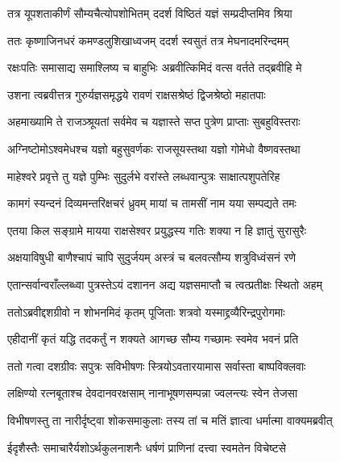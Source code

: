 \twolineshloka
{तत्र यूपशताकीर्णं सौम्यचैत्योपशोभितम्}
{ददर्श विष्ठितं यज्ञं सम्प्रदीप्तमिव श्रिया} %

\twolineshloka
{ततः कृष्णाजिनधरं कमण्डलुशिखाध्वजम्}
{ददर्श स्वसुतं तत्र मेघनादमरिन्दमम्} %

\twolineshloka
{रक्षःपतिः समासाद्य समाश्लिष्य च बाहुभिः}
{अब्रवीत्किमिदं वत्स वर्तते तद्ब्रवीहि मे} %

\twolineshloka
{उशना त्वब्रवीत्तत्र गुरुर्यज्ञसमृद्धये}
{रावणं राक्षसश्रेष्ठं द्विजश्रेष्ठो महातपाः} %

\twolineshloka
{अहमाख्यामि ते राजञ्श्रूयतां सर्वमेव च}
{यज्ञास्ते सप्त पुत्रेण प्राप्ताः सुबहुविस्तराः} %

\twolineshloka
{अग्निष्टोमोऽश्वमेधश्च यज्ञो बहुसुवर्णकः}
{राजसूयस्तथा यज्ञो गोमेधो वैष्णवस्तथा} %

\twolineshloka
{माहेश्वरे प्रवृत्ते तु यज्ञे पुम्भिः सुदुर्लभे}
{वरांस्ते लब्धवान्पुत्रः साक्षात्पशुपतेरिह} %

\twolineshloka
{कामगं स्यन्दनं दिव्यमन्तरिक्षचरं ध्रुवम्}
{मायां च तामसीं नाम यया सम्पद्यते तमः} %

\twolineshloka
{एतया किल सङ्ग्रामे मायया राक्षसेश्वर}
{प्रयुद्धस्य गतिः शक्या न हि ज्ञातुं सुरासुरैः} %

\twolineshloka
{अक्षयाविषुधी बाणैश्चापं चापि सुदुर्जयम्}
{अस्त्रं च बलवत्सौम्य शत्रुविध्वंसनं रणे} %

\twolineshloka
{एतान्सर्वान्वराँल्लब्ध्वा पुत्रस्तेऽयं दशानन}
{अद्य यज्ञसमाप्तौ च त्वत्प्रतीक्षः स्थितो अहम्} %

\twolineshloka
{ततोऽब्रवीद्दशग्रीवो न शोभनमिदं कृतम्}
{पूजिताः शत्रवो यस्माद्द्रव्यैरिन्द्रपुरोगमाः} %

\twolineshloka
{एहीदानीं कृतं यद्धि तदकर्तुं न शक्यते}
{आगच्छ सौम्य गच्छामः स्वमेव भवनं प्रति} %

\twolineshloka
{ततो गत्वा दशग्रीवः सपुत्रः सविभीषणः}
{स्त्रियोऽवतारयामास सर्वास्ता बाष्पविक्लवाः} %

\twolineshloka
{लक्षिण्यो रत्नबूताश्च देवदानवरक्षसाम्}
{नानाभूषणसम्पन्ना ज्वलन्त्यः स्वेन तेजसा} %

\twolineshloka
{विभीषणस्तु ता नारीर्दृष्ट्वा शोकसमाकुलाः}
{तस्य तां च मतिं ज्ञात्वा धर्मात्मा वाक्यमब्रवीत्} %

\twolineshloka
{ईदृशैस्तैः समाचारैर्यशोऽर्थकुलनाशनैः}
{धर्षणं प्राणिनां दत्त्वा स्वमतेन विचेष्टसे} %

